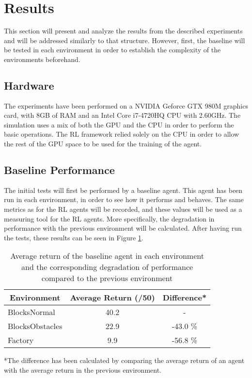 \section{Results}
This section will present and analyze the results from the described experiments 
and will be addressed similarly to that structure. However, first, the baseline 
will be tested in each environment in order to establish the complexity of the 
environments beforehand. 

\subsection{Hardware}
The experiments have been performed on a NVIDIA Geforce GTX 980M graphics card, 
with 8GB of RAM and an Intel Core i7-4720HQ CPU with 2.60GHz. The simulation uses a mix 
of both the GPU and the CPU in order to perform the basic operations. The RL framework 
relied solely on the CPU in order to allow the rest of the GPU space to be used for the 
training of the agent. 

\subsection{Baseline Performance}
The initial tests will first be performed by a baseline 
agent. This agent has been run in each environment, in order to see how it performs and 
behaves. The same metrics as for the RL agents will be recorded, and these values 
will be used as a measuring tool for the RL agents. More specifically, the 
degradation in performance with the previous environment will be calculated. After 
having run the tests, these results can be seen in Figure \ref{tab:BaselinesAVG}.

\begin{table}[h]
    \centering
    \caption{Average return of the baseline agent in each environment and the corresponding 
    degradation of performance compared to the previous environment}
    \label{tab:BaselinesAVG}
    \begin{tabular}{l|c|c}
    \multicolumn{1}{c|}{\textbf{Environment}} & \textbf{Average Return (/50)} & \textbf{Difference*} \\ \hline
    BlocksNormal    & 40.2 & -        \\
    BlocksObstacles & 22.9  & -43.0 \% \\
    Factory   & 9.9  & -56.8 \%
    \end{tabular}
    \justify
    \small
    *The difference has been calculated by comparing the average return of an agent with 
    the average return in the previous environment. 
\end{table}

